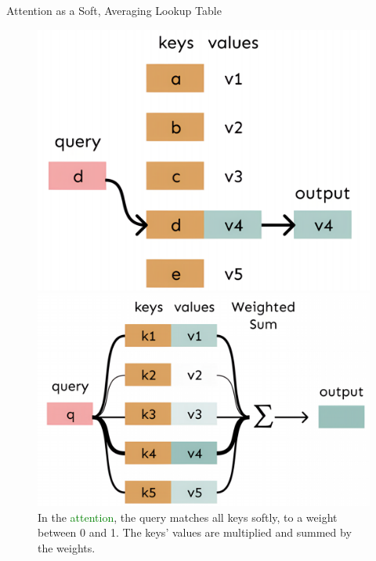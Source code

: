 \documentclass[serif, aspectratio=169]{beamer}
\begin{document}
\begin{frame}{Attention as a Soft, Averaging Lookup Table}
\begin{figure}[!htb]
    \centering
    \begin{minipage}{0.4\textwidth}
        \centering
        \includegraphics[width=\textwidth]{pic/attention-3.png}
        \caption{In a \textcolor{orange}{lookup table}, we have a table of keys that map to values. The query matches one of the keys, returning its value.}
        \label{fig:attention-4}
        
    \end{minipage}%
    \hfill
    {\vrule width 1pt}
    \hfill
    \begin{minipage}{0.48\textwidth}
        \centering
        \includegraphics[width=\textwidth]{pic/attention-4.png}
                \caption{In the \textcolor{green}{attention}, the query matches all keys softly, to a weight between 0 and 1. The keys' values are multiplied and summed by the weights.}
        \label{fig:attention-3}
    \end{minipage}
\end{figure}
    
\end{frame}
\end{document}
